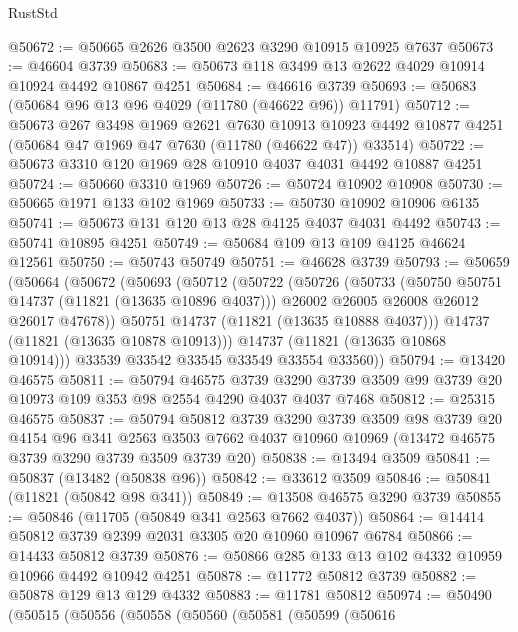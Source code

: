 \begin{lexlean}{RustStd}
\begin{coremodule}
@50672 := @50665 @2626 @3500 @2623 @3290 @10915 @10925 @7637
@50673 := @46604 @3739
@50683 := @50673 @118 @3499 @13 @2622 @4029 @10914 @10924 @4492 @10867 @4251
@50684 := @46616 @3739
@50693 := @50683 (@50684 @96 @13 @96 @4029 (@11780 (@46622 @96)) @11791)
@50712 := @50673
    @267
    @3498
    @1969
    @2621
    @7630
    @10913
    @10923
    @4492
    @10877
    @4251
    (@50684 @47 @1969 @47 @7630 (@11780 (@46622 @47)) @33514)
@50722 := @50673 @3310 @120 @1969 @28 @10910 @4037 @4031 @4492 @10887 @4251
@50724 := @50660 @3310 @1969
@50726 := @50724 @10902 @10908
@50730 := @50665 @1971 @133 @102 @1969
@50733 := @50730 @10902 @10906 @6135
@50741 := @50673 @131 @120 @13 @28 @4125 @4037 @4031 @4492
@50743 := @50741 @10895 @4251
@50749 := @50684 @109 @13 @109 @4125 @46624 @12561
@50750 := @50743 @50749
@50751 := @46628 @3739
@50793 := @50659
    (@50664
      (@50672
        (@50693
          (@50712
            (@50722
              (@50726
                (@50733
                  (@50750 @50751 @14737 (@11821 (@13635 @10896 @4037)))
                  @26002
                  @26005
                  @26008
                  @26012
                  @26017
                  @47678))
              @50751
              @14737
              (@11821 (@13635 @10888 @4037)))
            @14737
            (@11821 (@13635 @10878 @10913)))
          @14737
          (@11821 (@13635 @10868 @10914)))
        @33539
        @33542
        @33545
        @33549
        @33554
        @33560))
@50794 := @13420 @46575
@50811 := @50794
    @46575
    @3739
    @3290
    @3739
    @3509
    @99
    @3739
    @20
    @10973
    @109
    @353
    @98
    @2554
    @4290
    @4037
    @4037
    @7468
@50812 := @25315 @46575
@50837 := @50794
    @50812
    @3739
    @3290
    @3739
    @3509
    @98
    @3739
    @20
    @4154
    @96
    @341
    @2563
    @3503
    @7662
    @4037
    @10960
    @10969
    (@13472 @46575 @3739 @3290 @3739 @3509 @3739 @20)
@50838 := @13494 @3509
@50841 := @50837 (@13482 (@50838 @96))
@50842 := @33612 @3509
@50846 := @50841 (@11821 (@50842 @98 @341))
@50849 := @13508 @46575 @3290 @3739
@50855 := @50846 (@11705 (@50849 @341 @2563 @7662 @4037))
@50864 := @14414 @50812 @3739 @2399 @2031 @3305 @20 @10960 @10967 @6784
@50866 := @14433 @50812 @3739
@50876 := @50866 @285 @133 @13 @102 @4332 @10959 @10966 @4492 @10942 @4251
@50878 := @11772 @50812 @3739
@50882 := @50878 @129 @13 @129 @4332
@50883 := @11781 @50812
@50974 := @50490
    (@50515
      (@50556
        (@50558
          (@50560
            (@50581
              (@50599
                (@50616

\end{coremodule}
\end{lexlean}
